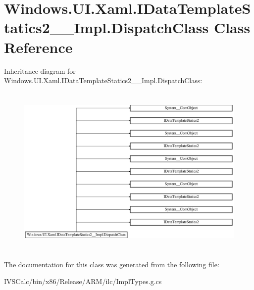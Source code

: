 \hypertarget{class_windows_1_1_u_i_1_1_xaml_1_1_i_data_template_statics2_____impl_1_1_dispatch_class}{}\section{Windows.\+U\+I.\+Xaml.\+I\+Data\+Template\+Statics2\+\_\+\+\_\+\+Impl.\+Dispatch\+Class Class Reference}
\label{class_windows_1_1_u_i_1_1_xaml_1_1_i_data_template_statics2_____impl_1_1_dispatch_class}
Inheritance diagram for Windows.\+U\+I.\+Xaml.\+I\+Data\+Template\+Statics2\+\_\+\+\_\+\+Impl.\+Dispatch\+Class\+:\begin{figure}[H]
\begin{center}
\leavevmode
\includegraphics[height=8.461538cm]{class_windows_1_1_u_i_1_1_xaml_1_1_i_data_template_statics2_____impl_1_1_dispatch_class}
\end{center}
\end{figure}


The documentation for this class was generated from the following file\+:\begin{DoxyCompactItemize}
\item 
I\+V\+S\+Calc/bin/x86/\+Release/\+A\+R\+M/ilc/Impl\+Types.\+g.\+cs\end{DoxyCompactItemize}
